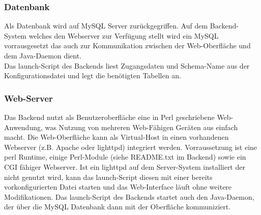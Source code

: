 \documentclass[12pt,a4paper]{article}
\begin{document}
\subsubsection{Datenbank}
Als Datenbank wird auf MySQL Server zurückgegriffen. Auf dem Backend-System welches den Webserver zur Verfügung stellt wird ein MySQL vorrausgesetzt das auch zur Kommunikation zwischen der Web-Oberfläche und dem Java-Daemon dient. \\
Das launch-Script des Backends liest Zugangsdaten und Schema-Name aus der Konfigurationsdatei und legt die benötigten Tabellen an.

\subsubsection{Web-Server}
Das Backend nutzt als Benutzeroberfläche eine in Perl geschriebene Web-Anwendung, was Nutzung von mehreren Web-Fähigen Geräten aus einfach macht. Die Web-Oberfläche kann als Virtual-Host in einen vorhandenen Webserver (z.B. Apache oder lighttpd) integriert werden. Vorraussetzung ist eine perl Runtime, einige Perl-Module (siehe README.txt im Backend) sowie ein CGI fähiger Webserver. Ist ein lighttpd auf dem Server-System installiert der nicht genutzt wird, kann das launch-Script diesen mit einer bereits vorkonfigurierten Datei starten und das Web-Interface läuft ohne weitere Modifikationen.
Das launch-Script des Backends startet auch den Java-Daemon, der über die MySQL Datenbank dann mit der Oberfläche kommuniziert.
		
\end{document}
